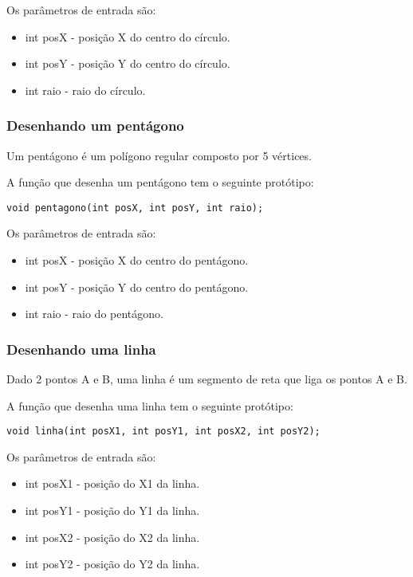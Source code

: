 \documentclass[12pt, %
openright,
oneside, %
a4paper,    %
brazil]{facom-ufu-abntex2}
\begin{document}
Os parâmetros de entrada são:

\begin{itemize}
    \item int posX - posição X do centro do círculo.
    \item int posY - posição Y do centro do círculo.
    \item int raio - raio do círculo.
\end{itemize}

\subsubsection{Desenhando um pentágono}
Um pentágono é um polígono regular composto por 5 vértices.

A função que desenha um pentágono tem o seguinte protótipo:

\begin{verbatim}
void pentagono(int posX, int posY, int raio);
\end{verbatim}

Os parâmetros de entrada são:

\begin{itemize}
    \item int posX - posição X do centro do pentágono.
    \item int posY - posição Y do centro do pentágono.
    \item int raio - raio do pentágono.
\end{itemize}

\subsubsection{Desenhando uma linha}
Dado 2 pontos A e B, uma linha é um segmento de reta que liga os pontos A e B.

A função que desenha uma linha tem o seguinte protótipo:

\begin{verbatim}
void linha(int posX1, int posY1, int posX2, int posY2);
\end{verbatim}

Os parâmetros de entrada são:

\begin{itemize}
    \item int posX1 - posição do X1 da linha.
    \item int posY1 - posição do Y1 da linha.
    \item int posX2 - posição do X2 da linha.
    \item int posY2 - posição do Y2 da linha.
\end{itemize}
\end{document}
